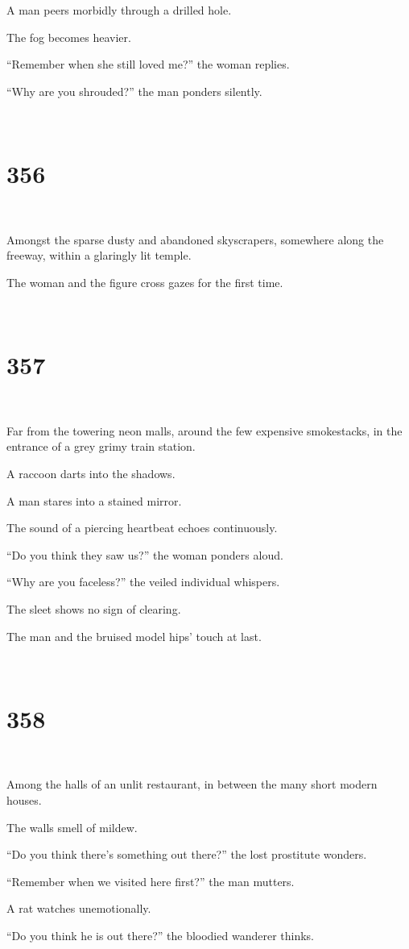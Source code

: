 \documentclass{report}
\begin{document}
A man peers morbidly through a drilled hole.

The fog becomes heavier.

``Remember when she still loved me?'' the woman replies.

``Why are you shrouded?'' the man ponders silently.

~
\chapter*{356}
~

Amongst the sparse dusty and abandoned skyscrapers, somewhere along the freeway, within a glaringly lit temple.

The woman and the figure cross gazes for the first time.

~
\chapter*{357}
~

Far from the towering neon malls, around the few expensive smokestacks, in the entrance of a grey grimy train station.

A raccoon darts into the shadows.

A man stares into a stained mirror.

The sound of a piercing heartbeat echoes continuously.

``Do you think they saw us?'' the woman ponders aloud.

``Why are you faceless?'' the veiled individual whispers.

The sleet shows no sign of clearing.

The man and the bruised model hips' touch at last.

~
\chapter*{358}
~

Among the halls of an unlit restaurant, in between the many short modern houses.

The walls smell of mildew.

``Do you think there's something out there?'' the lost prostitute wonders.

``Remember when we visited here first?'' the man mutters.

A rat watches unemotionally.

``Do you think he is out there?'' the bloodied wanderer thinks.
\end{document}
